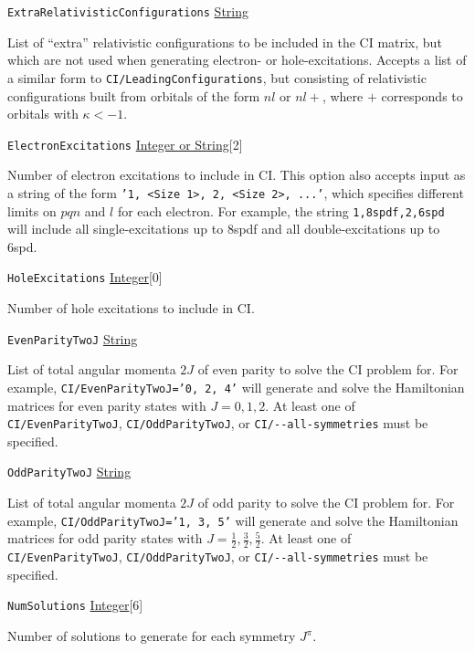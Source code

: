 \documentclass{report}
\begin{document}
\texttt{ExtraRelativisticConfigurations} \uline{String}
\begin{adjustwidth}{1cm}{}
List of ``extra'' relativistic configurations to be included in the CI matrix, but which are not used 
when generating electron- or hole-excitations. Accepts a list of a similar form to
\texttt{CI/LeadingConfigurations}, but consisting of relativistic configurations built from orbitals of
the form $nl$ or $nl+$, where $+$ corresponds to orbitals with $\kappa < -1$.
\end{adjustwidth}

\texttt{ElectronExcitations} \uline{Integer or String}[2]
\begin{adjustwidth}{1cm}{}
Number of electron excitations to include in CI. 
This option also accepts input as a string of the form \texttt{'1, <Size 1>, 2, <Size 2>, ...'},
which specifies different limits on $pqn$ and $l$ for each electron. For example, the string
\texttt{1,8spdf,2,6spd} will include all single-excitations up to 8spdf and all double-excitations up to 
6spd.
\end{adjustwidth}

\texttt{HoleExcitations} \uline{Integer}[0]
\begin{adjustwidth}{1cm}{}
Number of hole excitations to include in CI.
\end{adjustwidth}

\texttt{EvenParityTwoJ} \uline{String}
\begin{adjustwidth}{1cm}{}
List of total angular momenta $2J$ of even parity to solve the CI problem for.
For example, \texttt{CI/EvenParityTwoJ='0, 2, 4'} will generate and solve the Hamiltonian matrices for
even parity states with $J = 0, 1, 2$. At least one of \texttt{CI/EvenParityTwoJ}, 
\texttt{CI/OddParityTwoJ}, or \texttt{CI/{-}{-}all-symmetries} must be specified.
\end{adjustwidth}

\texttt{OddParityTwoJ} \uline{String}
\begin{adjustwidth}{1cm}{}
List of total angular momenta $2J$ of odd parity to solve the CI problem for.
For example, \texttt{CI/OddParityTwoJ='1, 3, 5'} will generate and solve the Hamiltonian matrices for
odd parity states with $J = \frac{1}{2}, \frac{3}{2}, \frac{5}{2}$. At least one of \texttt{CI/EvenParityTwoJ}, 
\texttt{CI/OddParityTwoJ}, or \texttt{CI/{-}{-}all-symmetries} must be specified.
\end{adjustwidth}

\texttt{NumSolutions} \uline{Integer}[6] 
\begin{adjustwidth}{1cm}{}
Number of solutions to generate for each symmetry $J^{\pi}$.
\end{adjustwidth}
\end{document}
